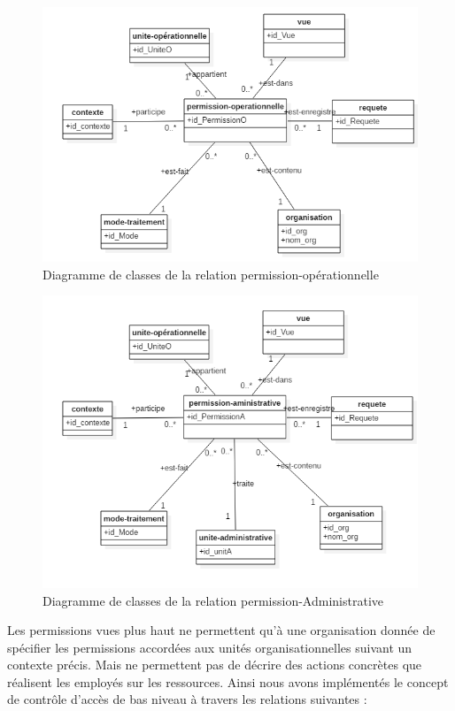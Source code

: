 \begin{figure}[h!]
    \centering
		\includegraphics[scale=0.7]{chap3/images/permissionO.png}
    \caption{Diagramme de classes de la relation permission-opérationnelle}
	 \label{figpermissionO}
\end{figure} 

\begin{figure}[h!]
    \centering
		\includegraphics[scale=0.7]{chap3/images/permissionA.png}
    \caption{Diagramme de classes de la relation permission-Administrative}
	 \label{figpermissionA}
\end{figure} 

\label{sectionSuggererTraiter}

Les permissions vues plus haut ne permettent qu'à une organisation donnée de spécifier les permissions accordées aux unités organisationnelles suivant un contexte précis. Mais ne permettent pas de décrire des actions concrètes que réalisent les employés sur les ressources. Ainsi nous avons implémentés le concept de contrôle d'accès de bas niveau à travers les relations suivantes : 

